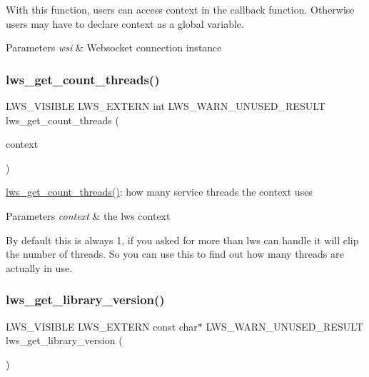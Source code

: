 With this function, users can access context in the callback function. Otherwise users may have to declare context as a global variable.


\begin{DoxyParams}{Parameters}
{\em wsi} & Websocket connection instance \\
\hline
\end{DoxyParams}
\mbox{\label{group__misc_ga629f48268fd1856b54b11172991b97d9}} 
\subsubsection{\texorpdfstring{lws\+\_\+get\+\_\+count\+\_\+threads()}{lws\_get\_count\_threads()}}
{\footnotesize\ttfamily L\+W\+S\+\_\+\+V\+I\+S\+I\+B\+LE L\+W\+S\+\_\+\+E\+X\+T\+E\+RN int L\+W\+S\+\_\+\+W\+A\+R\+N\+\_\+\+U\+N\+U\+S\+E\+D\+\_\+\+R\+E\+S\+U\+LT lws\+\_\+get\+\_\+count\+\_\+threads (\begin{DoxyParamCaption}\item[{struct \hyperlink{structlws__context}{lws\+\_\+context} $\ast$}]{context }\end{DoxyParamCaption})}

\hyperlink{group__misc_ga629f48268fd1856b54b11172991b97d9}{lws\+\_\+get\+\_\+count\+\_\+threads()}\+: how many service threads the context uses


\begin{DoxyParams}{Parameters}
{\em context} & the lws context\\
\hline
\end{DoxyParams}
By default this is always 1, if you asked for more than lws can handle it will clip the number of threads. So you can use this to find out how many threads are actually in use. \mbox{\label{group__misc_gac6abfc0b2bd5b2f09281a4432bb2f5f0}} 
\subsubsection{\texorpdfstring{lws\+\_\+get\+\_\+library\+\_\+version()}{lws\_get\_library\_version()}}
{\footnotesize\ttfamily L\+W\+S\+\_\+\+V\+I\+S\+I\+B\+LE L\+W\+S\+\_\+\+E\+X\+T\+E\+RN const char$\ast$ L\+W\+S\+\_\+\+W\+A\+R\+N\+\_\+\+U\+N\+U\+S\+E\+D\+\_\+\+R\+E\+S\+U\+LT lws\+\_\+get\+\_\+library\+\_\+version (\begin{DoxyParamCaption}\item[{void}]{ }\end{DoxyParamCaption})}

